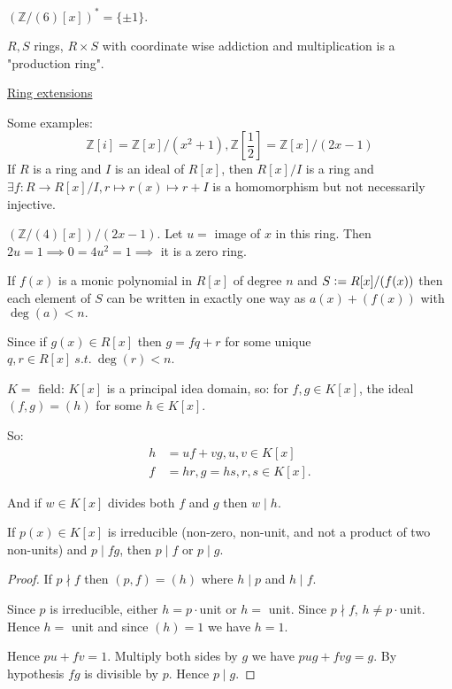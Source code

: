 \documentclass{article}
\newcommand{\Z}{\mathbb{Z}}
\newcommand{\st}{\ s.t.\ }
\newcommand{\defeq}{\vcentcolon=}
\theoremstyle{definition}
\theoremstyle{remark}
\begin{document}
$(\Z/(6)[x])^* = \{\pm 1\}$.

$R, S$ rings, $R \times S$ with coordinate wise addiction and multiplication is a "production ring".

\underline{Ring extensions}

Some examples:
\[
\Z[i] = \Z[x]/(x^2 + 1), \Z\left[\frac{1}{2}\right] = \Z[x]/(2x - 1)
\]
If $R$ is a ring and $I$ is an ideal of $R[x]$, then $R[x]/I$ is a ring and $\exists f: R \to R[x]/I, r \mapsto r(x) \mapsto r + I$ is a homomorphism but not necessarily injective. 

$(\Z/(4)[x])/(2x - 1).$ Let $u =$ image of $x$ in this ring. Then $2u = 1 \implies 0 = 4u^2 = 1 \implies $ it is a zero ring.

If $f(x)$ is a monic polynomial in $R[x]$ of degree $n$ and $S \defeq R[x]/(f(x))$ then each element of $S$ can be written in exactly one way as $a(x) + (f(x))$ with $\deg(a) < n.$

Since if $g(x) \in R[x]$ then $g = fq + r$ for some unique $q, r \in R[x] \st \deg(r) < n$.

$K =$ field: $K[x]$ is a principal idea domain, so: for $f, g \in K[x]$, the ideal $(f, g) = (h)$ for some $h \in K[x].$

So:
\begin{align*}
h & = uf + vg, u, v \in K[x] \\
f & = hr, g = hs, r, s \in K[x].
\end{align*}

And if $w \in K[x]$ divides both $f$ and $g$ then $w \mid h$.

If $p(x) \in K[x]$ is irreducible (non-zero, non-unit, and not a product of two non-units) and $p \mid fg$, then $p \mid f$ or $p \mid g$.
\begin{proof}
If $p \nmid f$ then $(p, f) = (h)$ where $h \mid p$ and $h \mid f$.

Since $p$ is irreducible, either $h = p \cdot$unit or $h =$ unit. Since $p \nmid f$, $h \neq p \cdot$unit. Hence $h = $ unit and since $(h) = 1$ we have $h = 1$.

Hence $pu + fv = 1$. Multiply both sides by $g$ we have $pug + fvg = g$. By hypothesis $fg$ is divisible by $p$. Hence $p \mid g$.
\end{proof}
\end{document}
